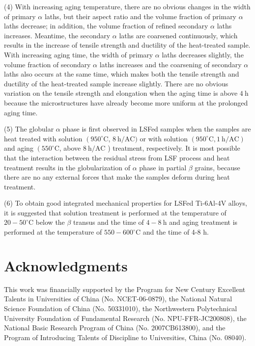 \documentclass[10pt]{article}
\begin{document}
(4) With increasing aging temperature, there are no obvious changes in the width of primary $\alpha$ laths, but their aspect ratio and the volume fraction of primary $\alpha$ laths decrease; in addition, the volume fraction of refined secondary $\alpha$ laths increases. Meantime, the secondary $\alpha$ laths are coarsened continuously, which results in the increase of tensile strength and ductility of the heat-treated sample. With increasing aging time, the width of primary $\alpha$ laths decreases slightly, the volume fraction of secondary $\alpha$ laths increases and the coarsening of secondary $\alpha$ laths also occurs at the same time, which makes both the tensile strength and ductility of the heat-treated sample increase slightly. There are no obvious variation on the tensile strength and elongation when the aging time is above $4 \mathrm{~h}$ because the microstructures have already become more uniform at the prolonged aging time.

(5) The globular $\alpha$ phase is first observed in LSFed samples when the samples are heat treated with solution $\left(950^{\circ} \mathrm{C}\right.$, $8 \mathrm{~h} / \mathrm{AC})$ or with solution $\left(950^{\circ} \mathrm{C}, 1 \mathrm{~h} / \mathrm{AC}\right)$ and aging $\left(550^{\circ} \mathrm{C}\right.$, above $8 \mathrm{~h} / \mathrm{AC}$ ) treatment, respectively. It is most possible that the interaction between the residual stress from LSF process and heat treatment results in the globularization of $\alpha$ phase in partial $\beta$ grains, because there are no any external forces that make the samples deform during heat treatment.

(6) To obtain good integrated mechanical properties for LSFed Ti-6Al-4V alloys, it is suggested that solution treatment is performed at the temperature of $20-50^{\circ} \mathrm{C}$ below the $\beta$ transus and the time of $4-8 \mathrm{~h}$ and aging treatment is performed at the temperature of $550-600^{\circ} \mathrm{C}$ and the time of 4-8 $\mathrm{h}$.

\section*{Acknowledgments}
This work was financially supported by the Program for New Century Excellent Talents in Universities of China (No. NCET-06-0879), the National Natural Science Foundation of China (No. 50331010), the Northwestern Polytechnical University Foundation of Fundamental Research (No. NPU-FFR-JC200808), the National Basic Research Program of China (No. 2007CB613800), and the Program of Introducing Talents of Discipline to Universities, China (No. 08040).
\end{document}

